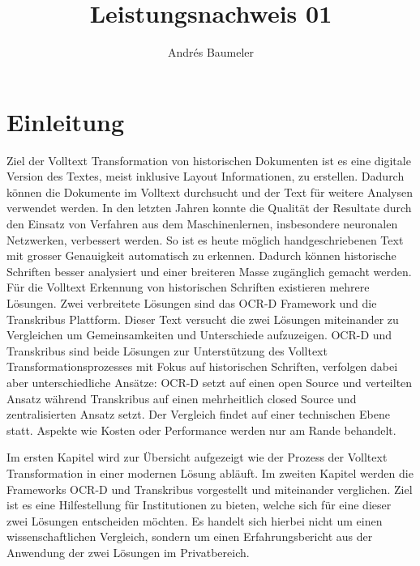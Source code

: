 \documentclass[a4paper,oneside, 12pt]{report}
\title{Leistungsnachweis 01}
\author{Andrés Baumeler}
\begin{document}

\pagestyle{empty} %





\cleardoublepage
\tableofcontents %
\cleardoublepage %

\pagestyle{plain} %



\chapter{Einleitung}\label{sec:motivation}
Ziel der Volltext Transformation von historischen Dokumenten ist es eine digitale Version des Textes, meist inklusive Layout Informationen, zu erstellen. Dadurch können die Dokumente im Volltext durchsucht und der Text für weitere Analysen verwendet werden. In den letzten Jahren konnte die Qualität der Resultate durch den Einsatz von Verfahren aus dem Maschinenlernen, insbesondere neuronalen Netzwerken, verbessert werden. So ist es heute möglich handgeschriebenen Text mit grosser Genauigkeit automatisch zu erkennen. Dadurch können historische Schriften besser analysiert und einer breiteren Masse zugänglich gemacht werden.
Für die Volltext Erkennung von historischen Schriften existieren mehrere Lösungen. Zwei verbreitete Lösungen sind das OCR-D Framework und die Transkribus Plattform. Dieser Text versucht die zwei Lösungen miteinander zu Vergleichen um Gemeinsamkeiten und Unterschiede aufzuzeigen. OCR-D und Transkribus sind beide Lösungen zur Unterstützung des Volltext Transformationsprozesses mit Fokus auf historischen Schriften, verfolgen dabei aber unterschiedliche Ansätze: OCR-D setzt auf einen open Source und verteilten Ansatz während Transkribus auf einen mehrheitlich closed Source und zentralisierten Ansatz setzt. Der Vergleich findet auf einer technischen Ebene statt. Aspekte wie Kosten oder Performance werden nur am Rande behandelt.

Im ersten Kapitel wird zur Übersicht aufgezeigt wie der Prozess der Volltext Transformation in einer modernen Lösung abläuft. Im zweiten Kapitel werden die Frameworks OCR-D und Transkribus vorgestellt und miteinander verglichen. Ziel ist es eine Hilfestellung für Institutionen zu bieten, welche sich für eine dieser zwei Lösungen entscheiden möchten. Es handelt sich hierbei nicht um einen wissenschaftlichen Vergleich, sondern um einen Erfahrungsbericht aus der Anwendung der zwei Lösungen im Privatbereich. 
\end{document}
